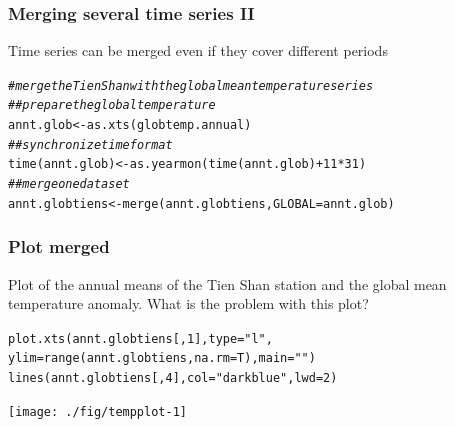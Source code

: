 \documentclass[xcolor=table, xcolor=dvipsnames]{beamer}\usepackage[]{graphicx}\usepackage[]{color}
\makeatletter
\newcommand{\hlnum}[1]{\textcolor[rgb]{0,0,0}{#1}}
\newcommand{\hlstr}[1]{\textcolor[rgb]{0.545,0.137,0.137}{#1}}
\newcommand{\hlcom}[1]{\textcolor[rgb]{0,0.392,0}{\textit{#1}}}
\newcommand{\hlopt}[1]{\textcolor[rgb]{0,0,0}{#1}}
\newcommand{\hlstd}[1]{\textcolor[rgb]{0,0,0}{#1}}
\newcommand{\hlkwb}[1]{\textcolor[rgb]{0,0,0}{#1}}
\newcommand{\hlkwc}[1]{\textcolor[rgb]{1,0,1}{#1}}
\newcommand{\hlkwd}[1]{\textcolor[rgb]{0,0,1}{#1}}
\newenvironment{kframe}{%
 \def\at@end@of@kframe{}%
 \ifinner\ifhmode%
  \def\at@end@of@kframe{\end{minipage}}%
  \begin{minipage}{\columnwidth}%
 \fi\fi%
 \def\FrameCommand##1{\hskip\@totalleftmargin \hskip-\fboxsep
 \colorbox{shadecolor}{##1}\hskip-\fboxsep
     \hskip-\linewidth \hskip-\@totalleftmargin \hskip\columnwidth}%
 \MakeFramed {\advance\hsize-\width
   \@totalleftmargin\z@ \linewidth\hsize
   \@setminipage}}%
 {\par\unskip\endMakeFramed%
 \at@end@of@kframe}
\newenvironment{knitrout}{}{} %
\makeatother
\begin{document}

\begin{frame}[fragile]\frametitle{Merging several time series II}
Time series can be merged even if they cover different periods
\begin{knitrout}\small
{}\color{fgcolor}\begin{kframe}
\begin{alltt}
\hlcom{# merge the Tien Shan with the global mean temperature series}
\hlcom{## prepare the global temperature}
\hlstd{annt.glob} \hlkwb{<-} \hlkwd{as.xts}\hlstd{(globtemp.annual)}
\hlcom{## synchronize time format }
\hlkwd{time}\hlstd{(annt.glob)} \hlkwb{<-} \hlkwd{as.yearmon}\hlstd{(}\hlkwd{time}\hlstd{(annt.glob)}\hlopt{+}\hlnum{11}\hlopt{*}\hlnum{31}\hlstd{)}
\hlcom{## merge one data set}
\hlstd{annt.globtiens} \hlkwb{<-} \hlkwd{merge}\hlstd{(annt.globtiens,} \hlkwc{GLOBAL}\hlstd{=annt.glob)}
\end{alltt}
\end{kframe}
\end{knitrout}
\end{frame}


\begin{frame}[fragile]\frametitle{Plot merged}
Plot of the annual means of the Tien Shan station and the global mean temperature anomaly. What is the problem with this plot?
\begin{knitrout}
\color{fgcolor}\begin{kframe}
\begin{alltt}
\hlkwd{plot.xts}\hlstd{(annt.globtiens[,}\hlnum{1}\hlstd{],} \hlkwc{type}\hlstd{=}\hlstr{"l"}\hlstd{,}
         \hlkwc{ylim}\hlstd{=}\hlkwd{range}\hlstd{(annt.globtiens,} \hlkwc{na.rm}\hlstd{=T),} \hlkwc{main}\hlstd{=}\hlstr{""}\hlstd{)}
\hlkwd{lines}\hlstd{(annt.globtiens[,}\hlnum{4}\hlstd{],} \hlkwc{col}\hlstd{=}\hlstr{"darkblue"}\hlstd{,} \hlkwc{lwd}\hlstd{=}\hlnum{2}\hlstd{)}
\end{alltt}
\end{kframe}

{\centering \texttt{[image: ./fig/tempplot-1]} 

}



\end{knitrout}
\end{frame}
\end{document}
